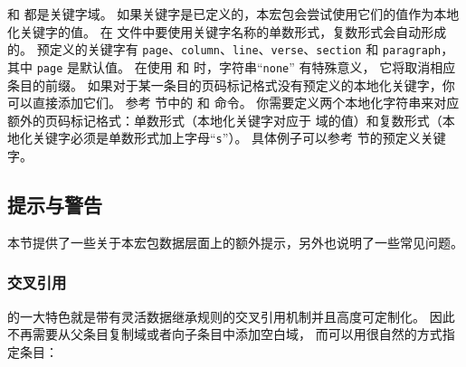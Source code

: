  和  都是关键字域。
如果关键字是已定义的，本宏包会尝试使用它们的值作为本地化关键字的值。
在  文件中要使用关键字名称的单数形式，复数形式会自动形成的。
预定义的关键字有 \texttt{page}、\texttt{column}、\texttt{line}、\texttt{verse}、\texttt{section} 和 \texttt{paragraph}，其中 \texttt{page} 是默认值。
在使用  和  时，字符串“\texttt{none}” 有特殊意义，
它将取消相应条目的前缀。
如果对于某一条目的页码标记格式没有预定义的本地化关键字，你可以直接添加它们。
参考  节中的  和  命令。
你需要定义两个本地化字符串来对应额外的页码标记格式：单数形式（本地化关键字对应于  域的值）和复数形式（本地化关键字必须是单数形式加上字母“\texttt{s}”）。
具体例子可以参考  节的预定义关键字。


\subsection{提示与警告}%
\label{bib:cav}

本节提供了一些关于本宏包数据层面上的额外提示，另外也说明了一些常见问题。

\subsubsection{交叉引用}%
\label{bib:cav:ref}


\biber 的一大特色就是带有灵活数据继承规则的交叉引用机制并且高度可定制化。
因此不再需要从父条目复制域或者向子条目中添加空白域，
而可以用很自然的方式指定条目：

